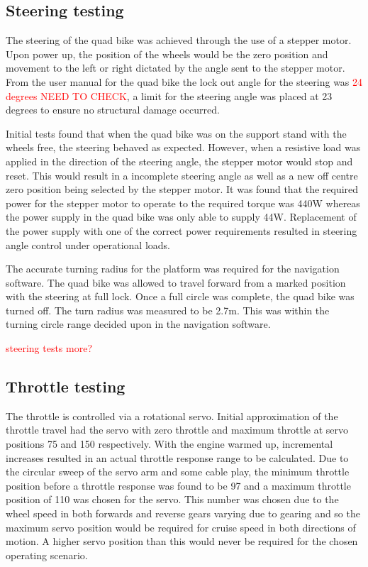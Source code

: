\documentclass[main.tex]{subfiles}
\begin{document}
\subsection{Steering testing}
The steering of the quad bike was achieved through the use of a stepper motor. Upon power up, the position of the wheels would be the zero position and movement to the left or right dictated by the angle sent to the stepper motor. From the user manual for the quad bike the lock out angle for the steering was \textcolor{red}{24 degrees NEED TO CHECK}, a limit for the steering angle was placed at 23 degrees to ensure no structural damage occurred. 

Initial tests found that when the quad bike was on the support stand with the wheels free, the steering behaved as expected. However, when a resistive load was applied in the direction of the steering angle, the stepper motor would stop and reset. This would result in a incomplete steering angle as well as a new off centre zero position being selected by the stepper motor.  It was found that the required power for the stepper motor to operate to the required torque was 440W whereas the power supply in the quad bike was only able to supply 44W. Replacement of the power supply with one of the correct power requirements resulted in steering angle control under operational loads.

The accurate turning radius for the platform was required for the navigation software. The quad bike was allowed to travel forward from a marked position with the steering at full lock. Once a full circle was complete, the quad bike was turned off. The turn radius was measured to be 2.7m. This was within the turning circle range decided upon in the navigation software.

\textcolor{red}{steering tests more?}

\subsection{Throttle testing}
The throttle is controlled via a rotational servo. Initial approximation of the throttle travel had the servo with zero throttle and maximum throttle at servo positions 75 and 150 respectively. With the engine warmed up, incremental increases resulted in an actual throttle response range to be calculated. Due to the circular sweep of the servo arm and some cable play, the minimum throttle position before a throttle response was found to be 97 and a maximum throttle position of 110 was chosen for the servo. This number was chosen due to the wheel speed in both forwards and reverse gears varying due to gearing and so the maximum servo position would be required for cruise speed in both directions of motion. A higher servo position than this would never be required for the chosen operating scenario.
\end{document}
